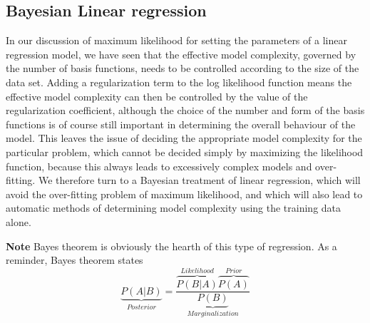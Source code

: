 \documentclass[main.tex]{subfiles}
\begin{document}
\subsection{Bayesian Linear regression} 
In our discussion of maximum likelihood for setting the parameters of a linear regression
model, we have seen that the effective model complexity, governed by the
number of basis functions, needs to be controlled according to the size of the data
set. Adding a regularization term to the log likelihood function means the effective
model complexity can then be controlled by the value of the regularization coefficient,
although the choice of the number and form of the basis functions is of course
still important in determining the overall behaviour of the model.
This leaves the issue of deciding the appropriate model complexity for the particular
problem, which cannot be decided simply by maximizing the likelihood function,
because this always leads to excessively complex models and over-fitting. We therefore turn to a Bayesian treatment of linear regression, which will
avoid the over-fitting problem of maximum likelihood, and which will also lead to
automatic methods of determining model complexity using the training data alone.

\textbf{Note} Bayes theorem is obviously the hearth of this type of regression. As a reminder, Bayes theorem states
\begin{equation}
    \underbrace{P(A|B)}_{Posterior} = \frac{\overbrace{P(B|A)}^{Likelihood} \overbrace{P(A)}^{Prior}}{\underbrace{P(B)}_{Marginalization}}
\end{equation}
\end{document}
